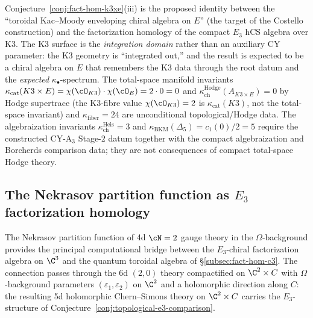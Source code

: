 \begin{remark}
\label{rem:fact-hom-adds}
Conjecture~\ref{conj:fact-hom-k3xe}(iii) is the proposed identity between the ``toroidal Kac--Moody enveloping chiral algebra on $E$'' (the target of the Costello construction) and the factorization homology of the compact $E_3$ hCS algebra over K3. The K3 surface is the \emph{integration domain} rather than an auxiliary CY parameter: the K3 geometry is ``integrated out,'' and the result is expected to be a chiral algebra on $E$ that remembers the K3 data through the root datum and the \emph{expected} $\kappa_\bullet$-spectrum. The total-space manifold invariants $\kappa_{\mathrm{cat}}(K3 \times E) = \chi(\cO_{K3}) \cdot \chi(\cO_E) = 2 \cdot 0 = 0$ and $\kappa_{\mathrm{ch}}^{\mathrm{Hodge}}(A_{K3\times E})=0$ by Hodge supertrace (the K3-fibre value $\chi(\cO_{K3}) = 2$ is $\kappa_{\mathrm{cat}}(K3)$, not the total-space invariant) and $\kappa_{\mathrm{fiber}} = 24$ are unconditional topological/Hodge data. The algebraization invariants $\kappa_{\mathrm{ch}}^{\mathrm{Heis}} = 3$ and $\kappa_{\mathrm{BKM}}(\Delta_5) = c_1(0)/2 = 5$ require the constructed CY-A$_3$ Stage-$2$ datum together with the compact algebraization and Borcherds comparison data; they are not consequences of compact total-space Hodge theory.
\end{remark}


\subsection{The Nekrasov partition function as \texorpdfstring{$E_3$}{E-3} factorization homology}
\label{subsec:nekrasov-e3}

The Nekrasov partition function of 4d $\cN = 2$ gauge theory in the $\Omega$-background provides the principal computational bridge between the $E_3$-chiral factorization algebra on $\C^3$ and the quantum toroidal algebra of \S\ref{subsec:fact-hom-c3}. The connection passes through the 6d $(2,0)$ theory compactified on $\C^2 \times C$ with $\Omega$-background parameters $(\varepsilon_1, \varepsilon_2)$ on $\C^2$ and a holomorphic direction along $C$: the resulting 5d holomorphic Chern--Simons theory on $\C^2 \times C$ carries the $E_3$-structure of Conjecture~\ref{conj:topological-e3-comparison}.

